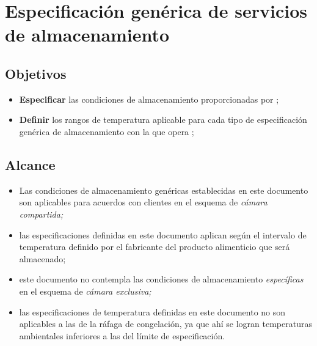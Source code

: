 \thispagestyle{formato-PI}
\renewcommand{\MayorVer}{2}
\renewcommand{\MenorVer}{1}
\renewcommand{\Codigo}{PSA-9-ESP} %
\renewcommand{\FechaPub}{2023--01}
\renewcommand{\Titulo}{Especificación genérica de servicios de almacenamiento}

\section{\Titulo}\label{esp:generica}

\subsection{Objetivos}

\begin{itemize}
	\item \textbf{Especificar} las condiciones de almacenamiento proporcionadas por ;
	\item \textbf{Definir} los rangos de temperatura aplicable para cada tipo de especificación genérica de almacenamiento con la que opera ;
\end{itemize}

\subsection{Alcance}

\begin{itemize}
	\item Las condiciones de almacenamiento genéricas establecidas en este documento son aplicables para acuerdos con clientes en el esquema de \emph{cámara compartida;}
	\item las especificaciones definidas en este documento aplican según el intervalo de temperatura definido por el fabricante del producto alimenticio que será almacenado;
	\item este documento no contempla las condiciones de almacenamiento \emph{específicas} en el esquema de \emph{cámara exclusiva;}
	\item las especificaciones de temperatura definidas en este documento no son aplicables a las de la ráfaga de congelación, ya que ahí se logran temperaturas ambientales inferiores a las del límite de especificación.
\end{itemize}


